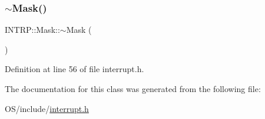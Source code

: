 \mbox{\label{class_i_n_t_r_p_1_1_mask_a9510ca576c94618168e76d14521c3e6d}} 
\subsubsection{\texorpdfstring{$\sim$\+Mask()}{~Mask()}}
{\footnotesize\ttfamily I\+N\+T\+R\+P\+::\+Mask\+::$\sim$\+Mask (\begin{DoxyParamCaption}{ }\end{DoxyParamCaption})\hspace{0.3cm}{\ttfamily [inline]}}



Definition at line 56 of file interrupt.\+h.



The documentation for this class was generated from the following file\+:\begin{DoxyCompactItemize}
\item 
O\+S/include/\hyperlink{interrupt_8h}{interrupt.\+h}\end{DoxyCompactItemize}
